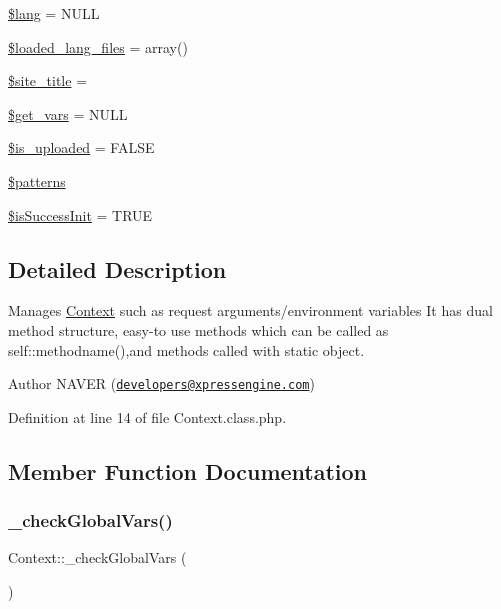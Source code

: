 \begin{DoxyCompactItemize}
\item 
\hyperlink{classContext_a0771720dad655d0c53f6f31066c67a40}{\$lang} = N\+U\+LL
\item 
\hyperlink{classContext_a0a199fec60b92b21746f1b6e93df01dc}{\$loaded\+\_\+lang\+\_\+files} = array()
\item 
\hyperlink{classContext_a3663ad0bbcb194dbb5766db96c9ecefb}{\$site\+\_\+title} = \textquotesingle{}\textquotesingle{}
\item 
\hyperlink{classContext_a587652913f4784dc8ad4a1cd4e3ee408}{\$get\+\_\+vars} = N\+U\+LL
\item 
\hyperlink{classContext_a4f8c544baae73ab83d08ec55e0c7c00d}{\$is\+\_\+uploaded} = F\+A\+L\+SE
\item 
\hyperlink{classContext_a257fa15929338411949a173ff34ab35d}{\$patterns}
\item 
\hyperlink{classContext_a342fb7b74268197dea5cadbe62aaea7a}{\$is\+Success\+Init} = T\+R\+UE
\end{DoxyCompactItemize}


\subsection{Detailed Description}
Manages \hyperlink{classContext}{Context} such as request arguments/environment variables It has dual method structure, easy-\/to use methods which can be called as self\+::methodname(),and methods called with static object.

\begin{DoxyAuthor}{Author}
N\+A\+V\+ER (\href{mailto:developers@xpressengine.com}{\tt developers@xpressengine.\+com}) 
\end{DoxyAuthor}


Definition at line 14 of file Context.\+class.\+php.



\subsection{Member Function Documentation}
\mbox{\label{classContext_a8030f7c76467bfcec812be76f55571cd}} 
\subsubsection{\texorpdfstring{\+\_\+check\+Global\+Vars()}{\_checkGlobalVars()}}
{\footnotesize\ttfamily Context\+::\+\_\+check\+Global\+Vars (\begin{DoxyParamCaption}{ }\end{DoxyParamCaption})}

